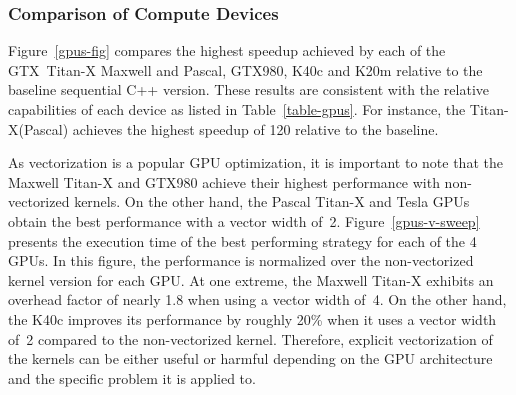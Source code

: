 \subsubsection{Comparison of Compute Devices}
Figure~\ref{gpus-fig} compares the highest speedup achieved by each of the
GTX~\mbox{Titan-X} Maxwell and Pascal, GTX980, K40c and K20m relative to the baseline
sequential C++ version. These results are consistent with the relative
capabilities of each device as listed in Table~\ref{table-gpus}. For instance,
the \mbox{Titan-X(Pascal)} achieves the highest speedup of 120 relative to the baseline.

As vectorization is a popular GPU optimization, it is important to note that
the Maxwell \mbox{Titan-X} and GTX980 achieve their highest performance with non-vectorized kernels.
On the other hand, the Pascal \mbox{Titan-X} and Tesla GPUs obtain the best performance with a vector
width of~2. Figure~\ref{gpus-v-sweep} presents the execution time of the best
performing strategy for each of the 4 GPUs. In this figure, the performance is
normalized over the non-vectorized kernel version for each GPU. At one extreme,
the Maxwell \mbox{Titan-X} exhibits an overhead factor of nearly 1.8 when using a vector
width of~4. On the other hand, the K40c improves its performance by roughly
20\% when it uses a vector width of~2 compared to the non-vectorized kernel.
Therefore, explicit vectorization of the kernels can be either useful or
harmful depending on the GPU architecture and the specific problem it is
applied to.



